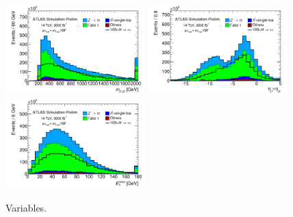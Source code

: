 \begin{figure}[!htpb]
  \includegraphics[width=0.48\textwidth]{figures/ATL-PHYS-PUB-2014-018/fig_03f}
  \includegraphics[width=0.48\textwidth]{figures/ATL-PHYS-PUB-2014-018/fig_03g}
  \includegraphics[width=0.48\textwidth]{figures/ATL-PHYS-PUB-2014-018/fig_03h}
  \caption{Variables.}
  \label{fig:prospects-hllhc-jets}
\end{figure}

